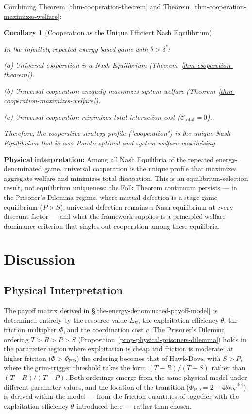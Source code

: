 \documentclass[11pt]{article}
\theoremstyle{plain}
\newtheorem{corollary}[theorem]{Corollary}
\theoremstyle{definition}
\theoremstyle{remark}
\let\origsection\section
\renewcommand{\section}{\needspace{12\baselineskip}\origsection}
\let\origsubsection\subsection
\renewcommand{\subsection}{\needspace{7\baselineskip}\origsubsection}
\begin{document}
Combining Theorem~\ref{thm-cooperation-theorem} and
Theorem~\ref{thm-cooperation-maximizes-welfare}:

\begin{corollary}[Cooperation as the Unique Efficient Nash Equilibrium]
\label{cor-cooperation-unique-efficient-ne}

In the infinitely repeated energy-based game with $\delta > \delta^*$:

(a) Universal cooperation is a Nash Equilibrium (Theorem~\ref{thm-cooperation-theorem}).

(b) Universal cooperation uniquely maximizes system welfare (Theorem~\ref{thm-cooperation-maximizes-welfare}).

(c) Universal cooperation minimizes total interaction cost ($\mathcal{C}_{\text{total}} = 0$).

Therefore, the cooperative strategy profile ("cooperation") is the unique Nash Equilibrium that is also Pareto-optimal and system-welfare-maximizing.
\end{corollary}

\textbf{Physical interpretation:} Among all Nash Equilibria of the
repeated energy-denominated game, universal cooperation is the unique
profile that maximizes aggregate welfare and minimizes total
dissipation. This is an equilibrium-selection result, not equilibrium
uniqueness: the Folk Theorem continuum persists --- in the Prisoner's
Dilemma regime, where mutual defection is a stage-game equilibrium
(\(P > S\)), universal defection remains a Nash equilibrium at every
discount factor --- and what the framework supplies is a principled
welfare-dominance criterion that singles out cooperation among these
equilibria.

\section{Discussion}\label{discussion}

\subsection{Physical Interpretation}\label{physical-interpretation}

The payoff matrix derived in §\ref{the-energy-denominated-payoff-model}
is determined entirely by the resource value \(E_R\), the exploitation
efficiency \(\theta\), the friction multiplier \(\Phi\), and the
coordination cost \(c\). The Prisoner's Dilemma ordering
\(T > R > P > S\) (Proposition~\ref{prop-physical-prisoners-dilemma})
holds in the parameter region where exploitation is cheap and friction
is moderate; at higher friction (\(\Phi > \Phi_{\text{PD}}\)) the
ordering becomes that of Hawk-Dove, with \(S > P\), where the
grim-trigger threshold takes the form \((T-R)/(T-S)\) rather than
\((T-R)/(T-P)\). Both orderings emerge from the same physical model
under different parameter values, and the location of the transition
(\(\Phi_{\text{PD}} = 2 + 4\theta\kappa\psi^{\text{def}}\)) is derived
within the model --- from the friction quantities of \citep{TC-IV}
together with the exploitation efficiency \(\theta\) introduced here ---
rather than chosen.
\end{document}
